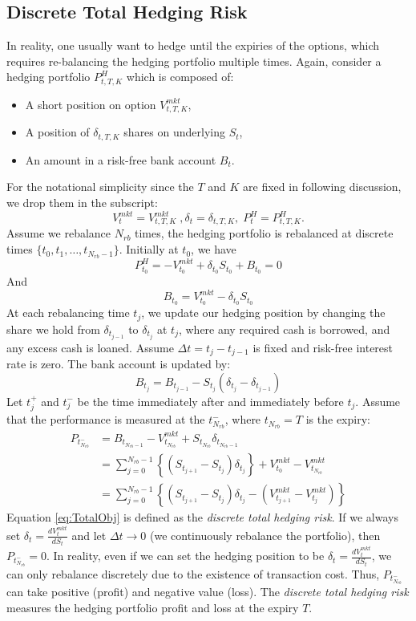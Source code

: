 \documentclass[letterpaper,12pt,titlepage,oneside,final]{book}
\numberwithin{equation}{section}
\theoremstyle{definition}
\newcommand{\Vmkt}{V^{mkt}}
\newcommand{\Smkt}{S}
\begin{document}
\subsection{Discrete Total Hedging Risk}
\label{sec:DiscreteTotalRisk}
In reality, one usually want to hedge until the expiries of the options, which requires re-balancing the hedging portfolio multiple times. Again,
consider a hedging portfolio $P^{H}_{t,T,K}$ which is composed of:
\begin{itemize}
	\item A short position on option $\Vmkt_{t,T,K}$,
	\item A position of $\delta_{t,T,K}$ shares on underlying $\Smkt_{t}$,
	\item An amount in a risk-free bank account $B_t$.
\end{itemize}
For the notational simplicity since the $T$ and $K$ are fixed in following discussion, we drop them in the subscript:
\[
    \Vmkt_{t}=\Vmkt_{t,T,K}\;,\delta_{t}=\delta_{t,T,K},\; P^{H}_t=P^{H}_{t,T,K}.
\]
Assume we rebalance $N_{rb}$ times, the hedging portfolio is rebalanced at discrete times $\{t_0,t_1,\dots,t_{N_{rb}-1}\}$. 
Initially at $t_0$, we have
\[
P^H_{t_0}=  -V_{t_0}^{mkt}+\delta_{t_0} S_{t_0}+ B_{t_0}=0
\]
And
\[
B_{t_0}=V_{t_0}^{mkt}-\delta_{t_0} S_{t_0}
\]
At each rebalancing time $t_j$, we update our hedging position by changing the share we hold from $\delta_{t_{j-1}}$ to $\delta_{t_j}$ at $t_j$, where any required cash is borrowed, and any excess cash is loaned. Assume $\Delta t=t_{j}-t_{j-1}$ is fixed and risk-free interest rate is zero.
The bank account is updated by:
\[
B_{t_{j}}= B_{t_{j-1}}-S_{t_j}(\delta_{t_j}-\delta_{t_{j-1}})
\]
Let $t_j^+$ and $t_j^-$   be the time immediately after  and immediately before $t_j$. Assume that the performance is measured at the $t_{N_{rb}}^-$, where $t_{N_{rb}}=T$ is the expiry:
\begin{equation}
\begin{split}
P_{t_{N_{rb}}^-}&=B_{t_{N_{rb}-1}}- V_{t_{N_{rb}}}^{mkt}+ S_{t_{N_{rb}}} \delta_{t_{N_{rb}-1}}  \\
&=\sum_{j=0}^{N_{rb}-1}\left\{ \left(S_{t_{j+1}}-S_{t_{j}}\right) \delta_{t_j} \right\}+ V_{t_0}^{mkt}-V_{t_{N_{rb}}}^{mkt}\\
&=\sum_{j=0}^{N_{rb}-1}\left\{ \left( S_{t_{j+1}}-S_{t_{j}}\right) \delta_{t_j} -(V_{t_{j+1}}^{mkt}-V_{t_j}^{mkt}) \right\}
\end{split}
\label{eq:TotalObj}
\end{equation}
Equation \eqref{eq:TotalObj} is defined as the {\em discrete total hedging risk}.
If we always set $\delta_t=\frac{d V_t^{mkt}}{d S_t}$ and let $\Delta t \rightarrow 0$ (we continuously rebalance the portfolio), then $P_{t_{N_{rb}}^-}=0$. In reality, even if we can set the hedging position to be $\delta_t=\frac{d V_t^{mkt}}{d S_t}$,  we can only rebalance discretely due to the existence of transaction cost. Thus, $P_{t_{N_{rb}}^-}$ can take positive (profit) and negative value (loss).
The  {\em discrete total hedging risk} measures the hedging portfolio profit and loss at the expiry $T$. 
\end{document}
